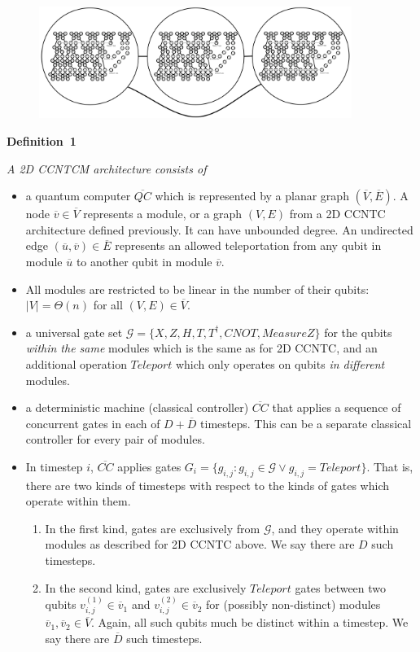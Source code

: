 \documentclass[twoside]{article}
\begin{document}
\begin{figure}[btp!]
\begin{center}
\includegraphics[width=4in]{./modules.pdf}
\end{center}
\label{fig:modules}
\end{figure}

{\noindent\bf Definition~1} {\it A \textsc{2D CCNTCM} architecture consists of

\begin{itemize}
\item a quantum computer $\overline{QC}$ which is represented by a planar graph $(\overline{V},\overline{E})$. A
node $\overline{v} \in \overline{V}$ represents a module, or a graph $(V,E)$
from a \textsc{2D CCNTC} architecture defined previously. It can have
unbounded degree.
An
undirected edge $(\overline{u},\overline{v}) \in \overline{E}$ represents an
allowed teleportation from any qubit in module $\overline{u}$ to
another qubit in module $\overline{v}$.
\item All modules are restricted to be linear in the number of their qubits:
$|V| = \Theta(n)$ for all $(V,E) \in \overline{V}$.
\item a universal gate set $\mathcal{G} = \{X, Z, H, T, T^{\dagger}, CNOT,
MeasureZ\}$
for the qubits \emph{within the same} modules which is the same as for \textsc{2D CCNTC},
and an additional operation $Teleport$ which only operates on qubits
\emph{in
different} modules.
\item a deterministic machine (classical controller) $\overline{CC}$ that applies a sequence
of concurrent gates in each of $D+\overline{D}$ timesteps.
This can be a separate classical controller
for every pair of modules.
\item In timestep $i$, $\overline{CC}$ applies
gates $G_i = \{g_{i,j} : g_{i,j} \in \mathcal{G} \lor g_{i,j} = Teleport \}$.
That is, there are two kinds of timesteps with respect to the kinds of gates
which operate within them.
\begin{enumerate}
\item In the first kind, gates are exclusively from $\mathcal{G}$, and
they operate within modules as described
for \textsc{2D CCNTC} above. We say there are $D$ such timesteps.
\item In the second kind, gates are exclusively $Teleport$ gates between two qubits $v^{(1)}_{i,j} \in \overline{v}_1$ and
$v^{(2)}_{i,j} \in \overline{v}_2$ for
(possibly non-distinct) modules $\overline{v}_1, \overline{v}_2 \in \overline{V}$.
Again, all such qubits much be distinct within a timestep.
We say there are $\overline{D}$ such timesteps.
\end{enumerate}


\end{itemize}}
\end{document}
